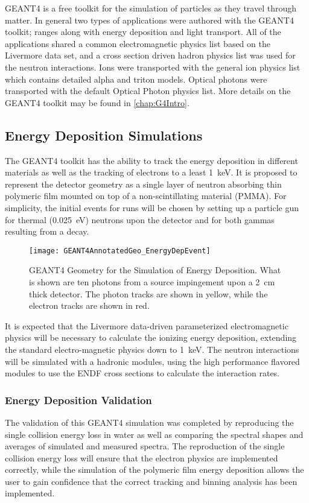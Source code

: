 GEANT4 is a free toolkit for the simulation of particles as they travel through matter\cite{agostinelli_geant4simulation_2003}.
In general two types of applications were authored with the GEANT4 toolkit; ranges along with energy deposition and light transport.
All of the applications shared a common electromagnetic physics list based on the Livermore data set, and a cross section driven hadron physics list was used for the neutron interactions.
Ions were transported with the general ion physics list which contains detailed alpha and triton models.
Optical photons were transported with the default Optical Photon physics list.
More details on the GEANT4 toolkit may be found in \autoref{chap:G4Intro}.

\subsection{Energy Deposition Simulations}
\label{sec:EnergyDeposition}
The GEANT4 toolkit has the ability to track the energy deposition in different materials as well as the tracking of electrons to a least \SI{1}{\keV}\cite{agostinelli_geant4simulation_2003}.
It is proposed to represent the detector geometry as a single layer of neutron absorbing thin polymeric film mounted on top of a non-scintillating material (PMMA).
For simplicity, the initial events for runs will be chosen by setting up a particle gun for thermal (\SI{0.025}{\eV}) neutrons upon the detector and for both gammas resulting from a  decay.
\begin{figure}
  \texttt{[image: GEANT4AnnotatedGeo\_EnergyDepEvent]}
	\caption[GEANT4 Energy Deposition Geometry]{GEANT4 Geometry for the Simulation of Energy Deposition. What is shown are ten photons from a  source impingement upon a \SI{2}{\cm} thick detector.  The photon tracks are shown in yellow, while the electron tracks are shown in red.}
	\label{fig:EDepSimGeo}
\end{figure}
It is expected that the Livermore data-driven parameterized electromagnetic physics will be necessary to calculate the ionizing energy deposition, extending the standard electro-magnetic physics down to \SI{1}{\kilo\eV}.
The neutron interactions will be simulated with a hadronic modules, using the high performance flavored modules to use the ENDF cross sections to calculate the interaction rates.

\subsubsection{Energy Deposition Validation}
The validation of this GEANT4 simulation was completed by reproducing the single collision energy loss in water as well as comparing  the spectral shapes and averages of simulated and measured spectra.
The reproduction of the single collision energy loss will ensure that the electron physics are implemented correctly, while the simulation of the polymeric film energy deposition allows the user to gain confidence that the correct tracking and binning analysis has been implemented.

